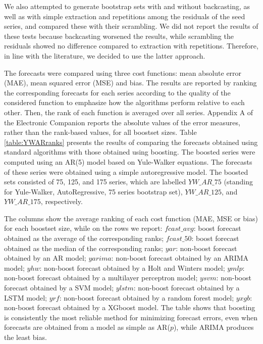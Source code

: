 \documentclass[ijoc,sglanonrev]{informs4}
\begin{document}
We also attempted to generate bootstrap sets with and without backcasting, as well as with simple extraction and repetitions among the residuals of the seed series, and compared these with their scrambling. We did not report the results of these tests because backcasting worsened the results, while scrambling the residuals showed no difference compared to extraction with repetitions. Therefore, in line with the literature, we decided to use the latter approach.

The forecasts were compared using three cost functions: mean absolute error (MAE), mean squared error (MSE) and bias. The results are reported by ranking the corresponding forecasts for each series according to the quality of the considered function to emphasize how the algorithms perform relative to each other. Then, the rank of each function is averaged over all series. Appendix A of the Electronic Companion reports the absolute values of the error measures, rather than the rank-based values, for all boostset sizes. 
Table \ref{table:YWARranks} presents the results of comparing the forecasts obtained using standard algorithms with those obtained using boosting. The boosted series were computed using an AR(5) model based on Yule-Walker equations. The forecasts of these series were obtained using a simple autoregressive model. The boosted sets consisted of 75, 125, and 175 series, which are labelled $YW\_AR\_75$ (standing for Yule-Walker, AutoRegressive, 75 series bootstrap set), $YW\_AR\_125$, and $YW\_AR\_175$, respectively.

The columns show the average ranking of each cost function (MAE, MSE or bias) for each boostset size, while on the rows we report:
	 $fcast\_avg$: boost forecast obtained as the average of the corresponding ranks;
	 $fcast\_50$: boost forecast obtained as the median of the corresponding ranks;
	 $yar$: non-boost forecast obtained by an AR model;
	 $yarima$: non-boost forecast obtained by an ARIMA model;
	 $yhw$: non-boost forecast obtained by a Holt and Winters model;
	 $ymlp$: non-boost forecast obtained by a multilayer perceptron model;
	 $ysvm$: non-boost forecast obtained by a SVM model;
	 $ylstm$: non-boost forecast obtained by a LSTM model;
	 $yrf$: non-boost forecast obtained by a random forest model;
	 $yxgb$: non-boost forecast obtained by a XGboost model.
The table shows that boosting is consistently the most reliable method for minimizing forecast errors, even when forecasts are obtained from a model as simple as AR($p$), while ARIMA produces the least bias.
\end{document}
